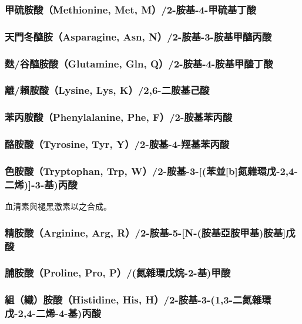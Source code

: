 \documentclass[a4paper,12pt]{report}
\begin{document}
\begin{itemize}
\begin{itemize}
\subsubsection{甲硫胺酸（Methionine, Met, M）/2-胺基-4-甲硫基丁酸}
\subsubsection{天門冬醯胺（Asparagine, Asn, N）/2-胺基-3-胺基甲醯丙酸}
\subsubsection{麩/谷醯胺酸（Glutamine, Gln, Q）/2-胺基-4-胺基甲醯丁酸}
\subsubsection{離/賴胺酸（Lysine, Lys, K）/2,6-二胺基己酸}
\subsubsection{苯丙胺酸（Phenylalanine, Phe, F）/2-胺基苯丙酸}
\subsubsection{酪胺酸（Tyrosine, Tyr, Y）/2-胺基-4-羥基苯丙酸}
\subsubsection{色胺酸（Tryptophan, Trp, W）/2-胺基-3-[(苯並[b]氮雜環戊-2,4-二烯)]-3-基)丙酸}
血清素與褪黑激素以之合成。
\subsubsection{精胺酸（Arginine, Arg, R）/2-胺基-5-[N-(胺基亞胺甲基)胺基]戊酸}
\subsubsection{脯胺酸（Proline, Pro, P）/(氮雜環戊烷-2-基)甲酸}
\subsubsection{組（織）胺酸（Histidine, His, H）/2-胺基-3-(1,3-二氮雜環戊-2,4-二烯-4-基)丙酸}

\end{itemize}
\end{itemize}
\end{document}
